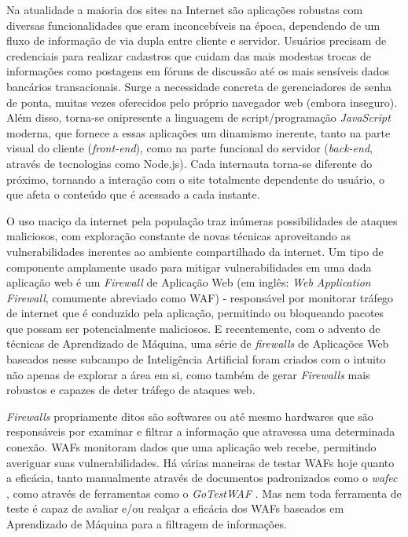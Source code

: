 Na atualidade a maioria dos sites na Internet são aplicações robustas com diversas funcionalidades que eram inconcebíveis na época, dependendo de um fluxo de informação de via dupla entre cliente e servidor. Usuários precisam de credenciais para realizar cadastros que cuidam das mais modestas trocas de informações como postagens em fóruns de discussão até os mais sensíveis dados bancários transacionais. Surge a necessidade concreta de gerenciadores de senha de ponta, muitas vezes oferecidos pelo próprio navegador web (embora inseguro). Além disso, torna-se onipresente a linguagem de script/programação \textit{JavaScript} moderna, que fornece a essas aplicações um dinamismo inerente, tanto na parte visual do cliente (\textit{front-end}), como na parte funcional do servidor (\textit{back-end}, através de tecnologias como Node.js). Cada internauta torna-se diferente do próximo, tornando a interação com o site totalmente dependente do usuário, o que afeta o conteúdo que é acessado a cada instante.

O uso maciço da internet pela população traz inúmeras possibilidades de ataques maliciosos, com exploração constante de novas técnicas aproveitando as vulnerabilidades inerentes ao ambiente compartilhado da internet. Um tipo de componente amplamente usado para mitigar vulnerabilidades em uma dada aplicação web é um \textit{Firewall} de Aplicação Web (em inglês: \textit{Web Application Firewall}, comumente abreviado como WAF) - responsável por monitorar tráfego de internet que é conduzido pela aplicação, permitindo ou bloqueando pacotes que possam ser potencialmente maliciosos. E recentemente, com o advento de técnicas de Aprendizado de Máquina, uma série de \textit{firewalls} de Aplicações Web baseados nesse subcampo de Inteligência Artificial foram criados com o intuito não apenas de explorar a área em si, como também de gerar \textit{Firewalls} mais robustos e capazes de deter tráfego de ataques web. 

\textit{Firewalls} propriamente ditos são softwares ou até mesmo hardwares que são responsáveis por examinar e filtrar a informação que atravessa uma determinada conexão. WAFs monitoram dados que uma aplicação web recebe, permitindo averiguar suas vulnerabilidades. Há várias maneiras de testar WAFs hoje quanto a eficácia, tanto manualmente através de documentos padronizados como o \textit{wafec} \cite{wafec_doc}, como através de ferramentas como o \textit{GoTestWAF} \cite{gotestwaf_wallarm}. Mas nem toda ferramenta de teste é capaz de avaliar e/ou realçar a eficácia dos WAFs baseados em Aprendizado de Máquina para a filtragem de informações.

